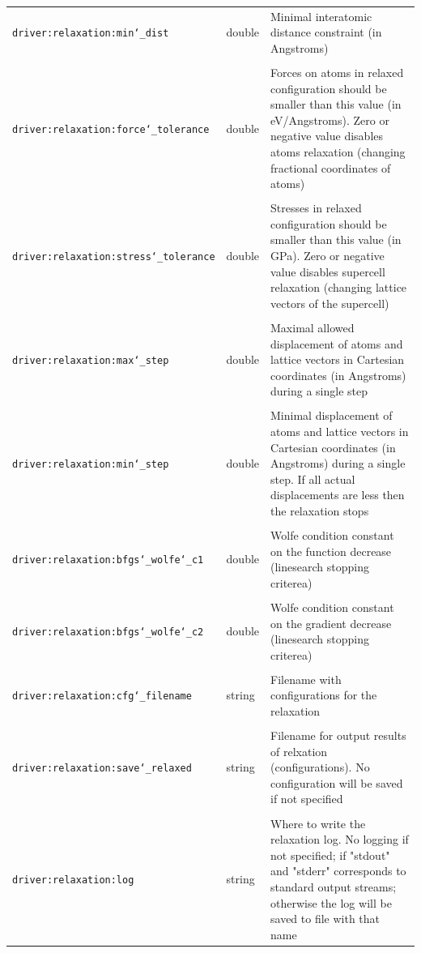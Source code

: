\documentclass[12pt]{article}
\renewcommand{\_}{\char`_}
\begin{document}
{\begin{longtable}{| p{\largestoption} | p{3.5em} | p{\descriptionlength} |}
		\texttt{driver:relaxation:min\_dist}& double&	Minimal interatomic distance constraint (in Angstroms)\\
&&\\
		\texttt{driver:relaxation:force\_tolerance}&double&	Forces on atoms in relaxed configuration should be smaller than this value (in eV/Angstroms). Zero or negative value disables atoms relaxation (changing fractional coordinates of atoms)			\\	
&&\\
		\texttt{driver:relaxation:stress\_tolerance}&double&	Stresses in relaxed configuration should be smaller than this value (in GPa). Zero or negative value disables supercell relaxation (changing lattice vectors of the supercell)				\\
&&\\
		\texttt{driver:relaxation:max\_step}&double&	Maximal allowed displacement of atoms and lattice vectors in Cartesian coordinates (in Angstroms) during a single step\\
&&\\
		\texttt{driver:relaxation:min\_step}&double&	Minimal displacement of atoms and lattice vectors in Cartesian coordinates (in Angstroms) during a single step. If all actual displacements are less then the relaxation stops\\
&&\\
		\texttt{driver:relaxation:bfgs\_wolfe\_c1}	&double&	Wolfe condition constant on the function decrease (linesearch stopping criterea)\\
&&\\
		\texttt{driver:relaxation:bfgs\_wolfe\_c2}	&double&	Wolfe condition constant on the gradient decrease (linesearch stopping criterea)\\
&&\\
		\texttt{driver:relaxation:cfg\_filename}& string& Filename with configurations for the relaxation\\
&&\\
		\texttt{driver:relaxation:save\_relaxed}	&string&	
		Filename for output results of relxation (configurations). No configuration will be saved if not specified\\
&&\\
		\texttt{driver:relaxation:log}&string&	Where to write the relaxation log. No logging if not specified; if "stdout" and "stderr" corresponds to standard output streams; otherwise the log will be saved to file with that name\\
		\hline
	\end{longtable}
}
\end{document}
